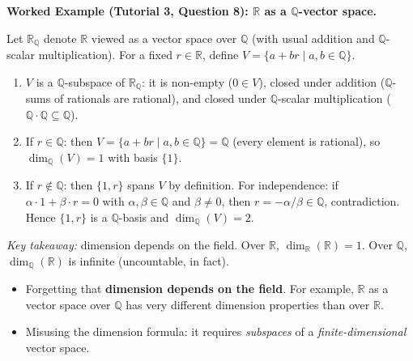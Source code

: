 \begin{examplebox}
\textbf{Worked Example (Tutorial 3, Question 8): $\mathbb{R}$ as a $\mathbb{Q}$-vector space.}

Let $\mathbb{R}_{\mathbb{Q}}$ denote $\mathbb{R}$ viewed as a vector space over $\mathbb{Q}$ (with usual addition and $\mathbb{Q}$-scalar multiplication).
For a fixed $r\in\mathbb{R}$, define $V=\{a+br\mid a,b\in\mathbb{Q}\}$.

\begin{enumerate}[leftmargin=*]
\item $V$ is a $\mathbb{Q}$-subspace of $\mathbb{R}_{\mathbb{Q}}$: it is non-empty ($0\in V$), closed under addition ($\mathbb{Q}$-sums of rationals are rational), and closed under $\mathbb{Q}$-scalar multiplication ($\mathbb{Q}\cdot\mathbb{Q}\subseteq\mathbb{Q}$).
\item If $r\in\mathbb{Q}$: then $V=\{a+br\mid a,b\in\mathbb{Q}\}=\mathbb{Q}$ (every element is rational), so $\dim_{\mathbb{Q}}(V)=1$ with basis $\{1\}$.
\item If $r\notin\mathbb{Q}$: then $\{1,r\}$ spans $V$ by definition.  For independence: if $\alpha\cdot 1+\beta\cdot r=0$ with $\alpha,\beta\in\mathbb{Q}$ and $\beta\neq 0$, then $r=-\alpha/\beta\in\mathbb{Q}$, contradiction.  Hence $\{1,r\}$ is a $\mathbb{Q}$-basis and $\dim_{\mathbb{Q}}(V)=2$.
\end{enumerate}

\emph{Key takeaway:} dimension depends on the field.  Over $\mathbb{R}$, $\dim_{\mathbb{R}}(\mathbb{R})=1$.  Over $\mathbb{Q}$, $\dim_{\mathbb{Q}}(\mathbb{R})$ is infinite (uncountable, in fact).
\end{examplebox}

\begin{commonmistake}

\begin{itemize}

\item Forgetting that \textbf{dimension depends on the field}. For example, $\mathbb{R}$ as a vector space over $\mathbb{Q}$ has very different dimension properties than over $\mathbb{R}$.

\item Misusing the dimension formula: it requires \emph{subspaces} of a \emph{finite-dimensional} vector space.

\end{itemize}

\end{commonmistake}

